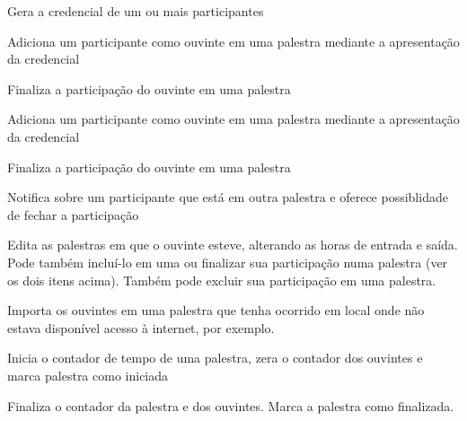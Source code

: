 \documentclass[12pt,a4paper]{article}
\begin{document}
        	{Gera a credencial de um ou mais participantes}
        	{%
        	
        	}
			
        	{Adiciona um participante como ouvinte em uma palestra mediante a apresentação da credencial}
        	{%
        	
        	}
        	{Finaliza a participação do ouvinte em uma palestra}
        	{%
        	
        	}
			
        	{Adiciona um participante como ouvinte em uma palestra mediante a apresentação da credencial}
        	{%
        	
        	}
			
        	{Finaliza a participação do ouvinte em uma palestra}
        	{%
        	
        	}
			
        	{Notifica sobre um participante que está em outra palestra e oferece possiblidade de fechar a participação}
        	{%
        	
        	}
			
        	{Edita as palestras em que o ouvinte esteve, alterando as horas de entrada e saída. Pode também incluí-lo em uma ou finalizar sua participação numa palestra (ver os dois itens acima). Também pode excluir sua participação em uma palestra.}
        	{%
        	
        	}
						
			
        	{Importa os ouvintes em uma palestra que tenha ocorrido em local onde não estava disponível acesso à internet, por exemplo.}
        	{%
        	
        	}
			
        	{Inicia o contador de tempo de uma palestra, zera o contador dos ouvintes e marca palestra como iniciada}
        	{%
        	
        	}
			
        	{Finaliza o contador da palestra e dos ouvintes. Marca a palestra como finalizada.}
        	{%
        	
        	}
			
\end{document}
